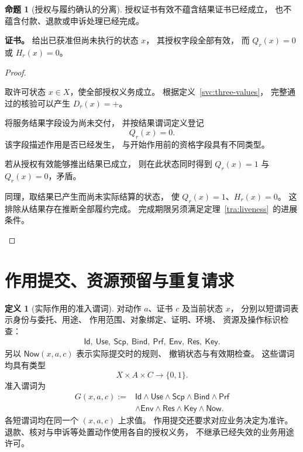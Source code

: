\documentclass[UTF8,12pt,a4paper,openany,fontset=none,zihao=false]{ctexrep}
\theoremstyle{definition}
\newtheorem{definition}{定义}[chapter]
\newtheorem{proposition}{命题}[chapter]
\newenvironment{certificate}{\par\noindent\textbf{证书。}\ignorespaces}{\par}
\newcommand{\1}{\mathbf 1}
\begin{document}
\begin{proposition}[授权与履约确认的分离]
\label{svc:authorization-not-result}
授权证书有效不蕴含结果证书已经成立，
也不蕴含付款、退款或申诉处理已经完成。
\end{proposition}
\begin{certificate}
给出已获准但尚未执行的状态 \(x\)，
其授权字段全部有效，
而 \(Q_r(x)=0\) 或 \(H_r(x)=0\)。
\end{certificate}
\begin{proof}
\begin{semanticsteps}
\item 取许可状态 \(x\in X\)，使全部授权义务成立。
根据定义~\ref{svc:three-values}，
完整通过的核验可以产生 \(D_r(x)=+\)。
\item 将服务结果字段设为尚未交付，
并按结果谓词定义登记
\[
Q_r(x)=0.
\]
该字段描述作用是否已经发生，
与开始作用前的资格字段具有不同类型。
\item 若从授权有效能够推出结果已成立，
则在此状态同时得到 \(Q_r(x)=1\) 与 \(Q_r(x)=0\)，矛盾。
\item 同理，取结果已产生而尚未实际结算的状态，
使 \(Q_r(x)=1\)、\(H_r(x)=0\)。
这排除从结果存在推断全部履约完成。
完成期限另须满足定理~\ref{tra:liveness}~的进展条件。
\end{semanticsteps}
\end{proof}

\section{作用提交、资源预留与重复请求}

\begin{definition}[实际作用的准入谓词]
\label{svc:gate}
对动作 \(a\)、证书 \(c\) 及当前状态 \(x\)，
分别以短谓词表示身份与委托、用途、
作用范围、对象绑定、证明、环境、
资源及操作标识检查：
\[
\begin{gathered}
\mathsf{Id},\ \mathsf{Use},\ \mathsf{Scp},\
\mathsf{Bind},\ \mathsf{Prf},\ \mathsf{Env},\
\mathsf{Res},\ \mathsf{Key}.
\end{gathered}
\]
另以 \(\mathsf{Now}(x,a,c)\) 表示实际提交时的规则、
撤销状态与有效期检查。
这些谓词均具有类型
\[
X\times A\times C\longrightarrow\{0,1\}.
\]
准入谓词为
\[
\begin{aligned}
G(x,a,c):={}&
\mathsf{Id}\land\mathsf{Use}\land\mathsf{Scp}
\land\mathsf{Bind}\land\mathsf{Prf}\\
&\land\mathsf{Env}\land\mathsf{Res}
\land\mathsf{Key}\land\mathsf{Now}.
\end{aligned}
\]
各短谓词均在同一个 \((x,a,c)\) 上求值。
作用提交还要求对应业务决定为准许。
退款、核对与申诉等处置动作使用各自的授权义务，
不继承已经失效的业务用途许可。
\end{definition}
\end{document}
